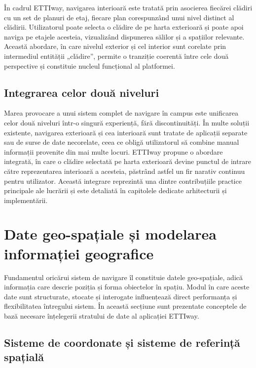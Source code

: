 În cadrul ETTIway, navigarea interioară este tratată prin asocierea fiecărei
clădiri cu un set de planuri de etaj, fiecare plan corespunzând unui nivel
distinct al clădirii. Utilizatorul poate selecta o clădire de pe harta
exterioară și poate apoi naviga pe etajele acesteia, vizualizând dispunerea
sălilor și a spațiilor relevante. Această abordare, în care nivelul exterior și
cel interior sunt corelate prin intermediul entității „clădire”, permite o
tranziție coerentă între cele două perspective și constituie nucleul
funcțional al platformei.

\subsection{Integrarea celor două niveluri}
\label{subsec:integrare}

Marea provocare a unui sistem complet de navigare în campus este unificarea
celor două niveluri într-o singură experiență, fără discontinuități. În multe
soluții existente, navigarea exterioară și cea interioară sunt tratate de
aplicații separate sau de surse de date necorelate, ceea ce obligă utilizatorul
să combine manual informații provenite din mai multe locuri. ETTIway propune o
abordare integrată, în care o clădire selectată pe harta exterioară devine
punctul de intrare către reprezentarea interioară a acesteia, păstrând astfel un
fir narativ continuu pentru utilizator. Această integrare reprezintă una dintre
contribuțiile practice principale ale lucrării și este detaliată în capitolele
dedicate arhitecturii și implementării.

\section{Date geo-spațiale și modelarea informației geografice}
\label{sec:date-geospatiale}

Fundamentul oricărui sistem de navigare îl constituie datele geo-spațiale, adică
informația care descrie poziția și forma obiectelor în spațiu. Modul în care
aceste date sunt structurate, stocate și interogate influențează direct
performanța și flexibilitatea întregului sistem. În această secțiune sunt
prezentate conceptele de bază necesare înțelegerii stratului de date al
aplicației ETTIway.

\subsection{Sisteme de coordonate și sisteme de referință spațială}
\label{subsec:srs}

